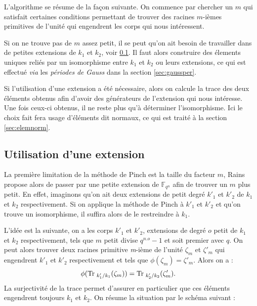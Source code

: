 \documentclass[a4paper]{article} %
\numberwithin{section}{part}
\numberwithin{equation}{section}
\newcommand\nroot[1]{\textit{#1}-ième}
\newcommand\GF[1]{\mathbb{F}_{#1}}
\begin{document}
L'algorithme se résume de la façon suivante. On commence par chercher un $m$ qui
satisfait certaines conditions permettant de trouver des racines $m$-ièmes
primitives de l'unité qui engendrent les corps qui nous intéressent.\par
Si on ne trouve pas de $m$ assez petit, il se peut qu'on ait besoin de
travailler dans de petites extensions de $k_1$ et $k_2$, voir
\ref{sec:extension}. Il faut alors construire des élements uniques 
reliés par un isomorphisme entre $k_1$ et $k_2$ ou leurs extensions, ce qui est
effectué \textit{via} les \emph{périodes de Gauss} dans la section 
\ref{sec:gaussper}.\par
Si l'utilisation d'une extension a été nécessaire, alors on calcule la trace des
deux éléments obtenus afin d'avoir des générateurs de l'extension qui nous
intéresse. Une fois ceux-ci obtenus, il ne reste plus qu'à déterminer
l'isomorphisme. Ici le choix fait fera usage d'éléments dit normaux, ce qui est
traité à la section \ref{sec:elemnorm}.

\subsection{Utilisation d'une extension}
\label{sec:extension}
La première limitation de la méthode de Pinch est la taille du facteur
$m$, Rains propose \cite{Rai} alors  de passer par une petite
extension de $\GF{q^n}$ afin de trouver un $m$ plus petit. En effet, imaginons 
qu'on ait deux extensions de petit degré $k'_1$ et $k'_2$ de $k_1$ et $k_2$ 
respectivement. Si on applique la méthode de Pinch à $k'_1$ et $k'_2$ et 
qu'on trouve un isomorphisme, il suffira alors de le restreindre à $k_1$.\par
L'idée est la suivante, on a les corps $k'_1$ et $k'_2$, extensions de degré $o$
petit de $k_1$ et $k_2$ respectivement, tels que $m$ petit divise $q^{n.o} -
1$ et soit premier avec $q$. On peut alors trouver deux racines primitive
\nroot{m} de l'unité $\zeta_{m}$ et $\zeta'_m$ qui engendrent $k'_1$ et $k'_2$
respectivement et tels que $\phi(\zeta_m) = \zeta'_m$. Alors on a : 
\begin{equation}
\phi(\textup{Tr\;}_{k'_1/k_1}(\zeta_{m})) =
\textup{Tr\;}_{k'_2/k_2}(\zeta'_{m}).
\end{equation}
La surjectivité de la trace permet d'assurer en particulier que ces
éléments engendrent toujours $k_1$ et $k_2$. On résume la situation par le 
schéma suivant :
\end{document}
